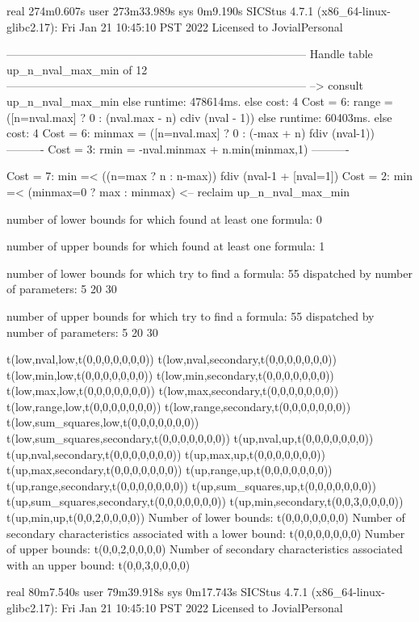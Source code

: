 real	274m0.607s
user	273m33.989s
sys	0m9.190s
SICStus 4.7.1 (x86_64-linux-glibc2.17): Fri Jan 21 10:45:10 PST 2022
Licensed to JovialPersonal


--------------------------------------------------------------------------------
Handle table up_n_nval_max_min of 12
--------------------------------------------------------------------------------
--> consult up_n_nval_max_min
else runtime: 478614ms. else cost: 4
Cost =  6:  range  = ([n=nval.max] ? 0 : (nval.max - n) cdiv (nval - 1)) %
else runtime: 60403ms. else cost: 4
Cost =  6:  minmax = ([n=nval.max] ? 0 : (-max + n) fdiv (nval-1)) %
----------
Cost =  3:  rmin   = -nval.minmax + n.min(minmax,1)
----------

Cost =  7:  min =< ((n=max ? n : n-max)) fdiv (nval-1 + [nval=1]) %
Cost =  2:  min =< (minmax=0 ? max : minmax)
<-- reclaim up_n_nval_max_min

number of lower bounds for which found at least one formula: 0

number of upper bounds for which found at least one formula: 1

number of lower bounds for which try to find a formula: 55
dispatched by number of parameters: 5  20  30

number of upper bounds for which try to find a formula: 55
dispatched by number of parameters: 5  20  30

t(low,nval,low,t(0,0,0,0,0,0,0))
t(low,nval,secondary,t(0,0,0,0,0,0,0))
t(low,min,low,t(0,0,0,0,0,0,0))
t(low,min,secondary,t(0,0,0,0,0,0,0))
t(low,max,low,t(0,0,0,0,0,0,0))
t(low,max,secondary,t(0,0,0,0,0,0,0))
t(low,range,low,t(0,0,0,0,0,0,0))
t(low,range,secondary,t(0,0,0,0,0,0,0))
t(low,sum_squares,low,t(0,0,0,0,0,0,0))
t(low,sum_squares,secondary,t(0,0,0,0,0,0,0))
t(up,nval,up,t(0,0,0,0,0,0,0))
t(up,nval,secondary,t(0,0,0,0,0,0,0))
t(up,max,up,t(0,0,0,0,0,0,0))
t(up,max,secondary,t(0,0,0,0,0,0,0))
t(up,range,up,t(0,0,0,0,0,0,0))
t(up,range,secondary,t(0,0,0,0,0,0,0))
t(up,sum_squares,up,t(0,0,0,0,0,0,0))
t(up,sum_squares,secondary,t(0,0,0,0,0,0,0))
t(up,min,secondary,t(0,0,3,0,0,0,0))
t(up,min,up,t(0,0,2,0,0,0,0))
Number of lower bounds:                                             t(0,0,0,0,0,0,0)
Number of secondary characteristics associated with a lower bound:  t(0,0,0,0,0,0,0)
Number of upper bounds:                                             t(0,0,2,0,0,0,0)
Number of secondary characteristics associated with an upper bound: t(0,0,3,0,0,0,0)

real	80m7.540s
user	79m39.918s
sys	0m17.743s
SICStus 4.7.1 (x86_64-linux-glibc2.17): Fri Jan 21 10:45:10 PST 2022
Licensed to JovialPersonal


